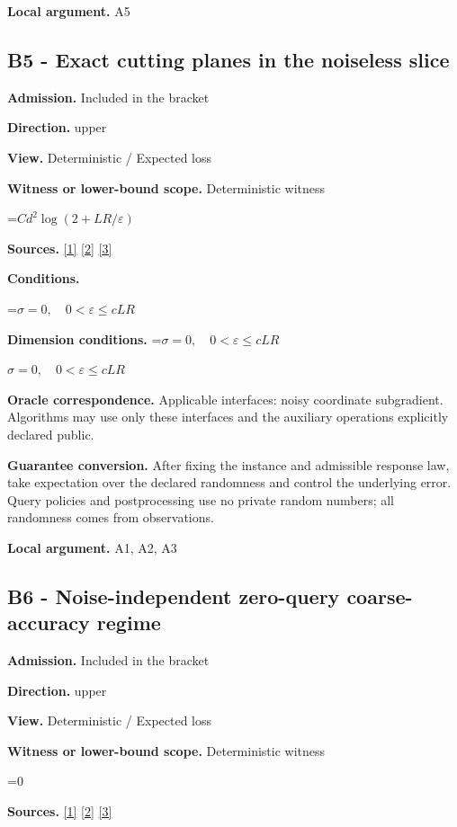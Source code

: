 \documentclass[10pt,a4paper]{article}
\newcommand{\AtlasMath}[1]{\par\begingroup\centering\setbox0=\hbox{$\displaystyle #1$}\ifdim\wd0>1.4\linewidth\typeout{ATLAS WIDE FORMULA: \the\wd0}\fi\ifdim\wd0>\linewidth\resizebox{\linewidth}{!}{\box0}\else\box0\fi\par\endgroup}
\newcommand{\AtlasInlineMath}[1]{\begingroup\setbox0=\hbox{$#1$}\ifdim\wd0>.4\linewidth\endgroup\AtlasMath{#1}\else\endgroup$#1$\fi}
\begin{document}
\textbf{Local argument.} A5

\subsection{B5 - Exact cutting planes in the noiseless slice}
\textbf{Admission.} Included in the bracket

\textbf{Direction.} upper

\textbf{View.} Deterministic / Expected loss

\textbf{Witness or lower-bound scope.} Deterministic witness

\AtlasMath{Cd^2\log(2+LR/\varepsilon)}
\textbf{Sources.} \href{https://arxiv.org/pdf/1405.4980}{[1]} \href{https://www2.isye.gatech.edu/~nemirovs/MOR_AccuracyCertificates.pdf}{[2]} \href{https://arxiv.org/pdf/2609.20701}{[3]}

\textbf{Conditions.} 
\AtlasMath{\sigma=0,\quad0<\varepsilon\le cLR}


\textbf{Dimension conditions.} \AtlasInlineMath{\sigma=0,\quad0<\varepsilon\le cLR}

\textbf{Oracle correspondence.} Applicable interfaces: noisy coordinate subgradient. Algorithms may use only these interfaces and the auxiliary operations explicitly declared public.

\textbf{Guarantee conversion.} After fixing the instance and admissible response law, take expectation over the declared randomness and control the underlying error. Query policies and postprocessing use no private random numbers; all randomness comes from observations.

\textbf{Local argument.} A1, A2, A3

\subsection{B6 - Noise-independent zero-query coarse-accuracy regime}
\textbf{Admission.} Included in the bracket

\textbf{Direction.} upper

\textbf{View.} Deterministic / Expected loss

\textbf{Witness or lower-bound scope.} Deterministic witness

\AtlasMath{0}
\textbf{Sources.} \href{https://arxiv.org/pdf/1405.4980}{[1]} \href{https://www2.isye.gatech.edu/~nemirovs/MOR_AccuracyCertificates.pdf}{[2]} \href{https://arxiv.org/pdf/2609.20701}{[3]}
\end{document}

